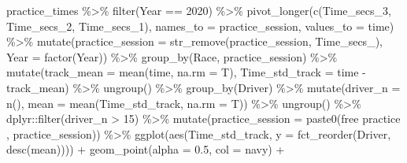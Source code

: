 \documentclass[
]{book}
\newenvironment{Shaded}{\begin{snugshade}}{\end{snugshade}}
\newcommand{\AttributeTok}[1]{\textcolor[rgb]{0.77,0.63,0.00}{#1}}
\newcommand{\DecValTok}[1]{\textcolor[rgb]{0.00,0.00,0.81}{#1}}
\newcommand{\FloatTok}[1]{\textcolor[rgb]{0.00,0.00,0.81}{#1}}
\newcommand{\FunctionTok}[1]{\textcolor[rgb]{0.00,0.00,0.00}{#1}}
\newcommand{\NormalTok}[1]{#1}
\newcommand{\SpecialCharTok}[1]{\textcolor[rgb]{0.00,0.00,0.00}{#1}}
\newcommand{\StringTok}[1]{\textcolor[rgb]{0.31,0.60,0.02}{#1}}
\begin{document}
\begin{Shaded}
\begin{Highlighting}[]
\NormalTok{practice\_times }\SpecialCharTok{\%\textgreater{}\%}
  \FunctionTok{filter}\NormalTok{(Year }\SpecialCharTok{==} \DecValTok{2020}\NormalTok{) }\SpecialCharTok{\%\textgreater{}\%} 
  \FunctionTok{pivot\_longer}\NormalTok{(}\FunctionTok{c}\NormalTok{(Time\_secs\_3, Time\_secs\_2, Time\_secs\_1), }\AttributeTok{names\_to =} \StringTok{\textquotesingle{}practice\_session\textquotesingle{}}\NormalTok{, }\AttributeTok{values\_to =} \StringTok{\textquotesingle{}time\textquotesingle{}}\NormalTok{) }\SpecialCharTok{\%\textgreater{}\%}
  \FunctionTok{mutate}\NormalTok{(}\AttributeTok{practice\_session =} \FunctionTok{str\_remove}\NormalTok{(practice\_session, }\StringTok{\textquotesingle{}Time\_secs\_\textquotesingle{}}\NormalTok{),}
         \AttributeTok{Year =} \FunctionTok{factor}\NormalTok{(Year)) }\SpecialCharTok{\%\textgreater{}\%}
   \FunctionTok{group\_by}\NormalTok{(Race, practice\_session) }\SpecialCharTok{\%\textgreater{}\%}
   \FunctionTok{mutate}\NormalTok{(}\AttributeTok{track\_mean =} \FunctionTok{mean}\NormalTok{(time, }\AttributeTok{na.rm =}\NormalTok{ T),}
          \AttributeTok{Time\_std\_track =}\NormalTok{ time }\SpecialCharTok{{-}}\NormalTok{ track\_mean) }\SpecialCharTok{\%\textgreater{}\%} 
   \FunctionTok{ungroup}\NormalTok{() }\SpecialCharTok{\%\textgreater{}\%} 
   \FunctionTok{group\_by}\NormalTok{(Driver) }\SpecialCharTok{\%\textgreater{}\%} 
   \FunctionTok{mutate}\NormalTok{(}\AttributeTok{driver\_n =} \FunctionTok{n}\NormalTok{(),}
          \AttributeTok{mean =} \FunctionTok{mean}\NormalTok{(Time\_std\_track, }\AttributeTok{na.rm =}\NormalTok{ T)) }\SpecialCharTok{\%\textgreater{}\%}
   \FunctionTok{ungroup}\NormalTok{() }\SpecialCharTok{\%\textgreater{}\%}
\NormalTok{   dplyr}\SpecialCharTok{::}\FunctionTok{filter}\NormalTok{(driver\_n }\SpecialCharTok{\textgreater{}} \DecValTok{15}\NormalTok{) }\SpecialCharTok{\%\textgreater{}\%} 
  \FunctionTok{mutate}\NormalTok{(}\AttributeTok{practice\_session =} \FunctionTok{paste0}\NormalTok{(}\StringTok{\textquotesingle{}free practice \textquotesingle{}}\NormalTok{, practice\_session)) }\SpecialCharTok{\%\textgreater{}\%}  
   \FunctionTok{ggplot}\NormalTok{(}\FunctionTok{aes}\NormalTok{(Time\_std\_track, }\AttributeTok{y =} \FunctionTok{fct\_reorder}\NormalTok{(Driver, }\FunctionTok{desc}\NormalTok{(mean)))) }\SpecialCharTok{+}
   \FunctionTok{geom\_point}\NormalTok{(}\AttributeTok{alpha =} \FloatTok{0.5}\NormalTok{, }\AttributeTok{col =} \StringTok{\textquotesingle{}navy\textquotesingle{}}\NormalTok{) }\SpecialCharTok{+}

\end{Highlighting}
\end{Shaded}
\end{document}
